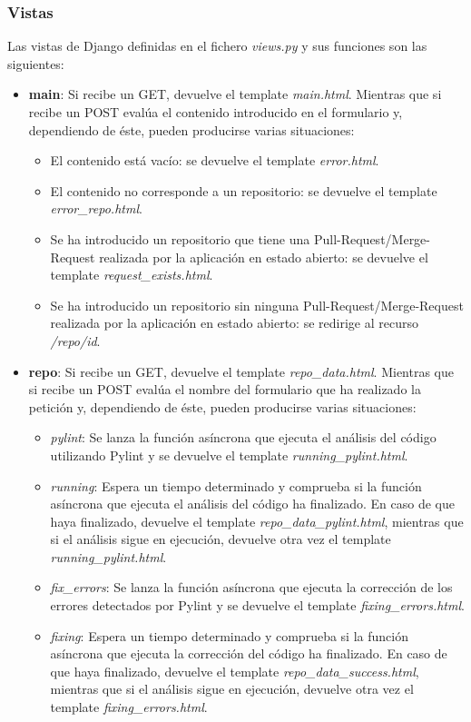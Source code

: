 \documentclass[a4paper, 12pt]{book}
\begin{document}
\subsubsection{Vistas}
\label{subsubsec:django_vistas}
 Las vistas de Django definidas en el fichero \textit{views.py} y sus funciones son las siguientes:
\begin{itemize}
	\item \textbf{main}: Si recibe un GET, devuelve el template \textit{main.html}.
	Mientras que si recibe un POST evalúa el contenido introducido en el formulario y, dependiendo de éste, pueden producirse varias situaciones:
	\begin{itemize}
		\item El contenido está vacío: se devuelve el template \textit{error.html}.
		\item El contenido no corresponde a un repositorio: se devuelve el template \textit{error\_repo.html}.
		\item Se ha introducido un repositorio que tiene una Pull-Request/Merge-Request realizada por la aplicación en estado abierto: se devuelve el template \textit{request\_exists.html}.
		\item Se ha introducido un repositorio sin ninguna Pull-Request/Merge-Request realizada por la aplicación en estado abierto: se redirige al recurso \textit{/repo/id}.
	\end{itemize}
	\item \textbf{repo}: Si recibe un GET, devuelve el template \textit{repo\_data.html}.
	Mientras que si recibe un POST evalúa el nombre del formulario que ha realizado la petición y, dependiendo de éste, pueden producirse varias situaciones:
	\begin{itemize}
		\item \textit{pylint}: Se lanza la función asíncrona que ejecuta el análisis del código utilizando Pylint y se devuelve el template \textit{running\_pylint.html}.
		\item \textit{running}: Espera un tiempo determinado y comprueba si la función asíncrona que ejecuta el análisis del código ha finalizado. En caso de que haya finalizado, devuelve el template \textit{repo\_data\_pylint.html}, mientras que si el análisis sigue en ejecución, devuelve otra vez el template \textit{running\_pylint.html}.
		\item \textit{fix\_errors}: Se lanza la función asíncrona que ejecuta la corrección de los errores detectados por Pylint y se devuelve el template \textit{fixing\_errors.html}.
		\item \textit{fixing}: Espera un tiempo determinado y comprueba si la función asíncrona que ejecuta la corrección del código ha finalizado. En caso de que haya finalizado, devuelve el template \textit{repo\_data\_success.html}, mientras que si el análisis sigue en ejecución, devuelve otra vez el template \textit{fixing\_errors.html}.

\end{itemize}
\end{itemize}
\end{document}

